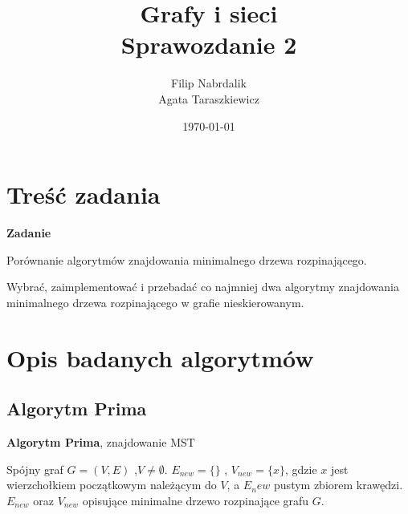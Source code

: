 \documentclass[a4paper, 10pt]{article}
\title{{\bf {Grafy i sieci}} \\ {\large Sprawozdanie 2}}
\date{\today}
\author{Filip Nabrdalik \\Agata Taraszkiewicz}
\begin{document}


\maketitle 




\newcommand{\ang}[1]{(ang. {\em #1}\/)}
\newcommand{\e}[1]{{\em #1}\/}





\section{Treść zadania}

{\bf{Zadanie}}

Porównanie algorytmów znajdowania minimalnego drzewa rozpinającego.

Wybrać, zaimplementować i przebadać co najmniej dwa algorytmy znajdowania minimalnego drzewa rozpinającego w grafie nieskierowanym. 

 

\section{Opis badanych algorytmów}

	\subsection{Algorytm Prima}

\begin{algorithm}
\caption{{\bf Algorytm Prima}, znajdowanie MST}
\begin{algorithmic}[!h]
\REQUIRE Spójny graf $G=(V,E)$ ,$V \neq \emptyset$. 
\ENSURE $E_{new}=\{\}$ , $V_{new}=\{x\}$, gdzie $x$ jest wierzchołkiem początkowym należącym do $V$, a $E_new$ pustym zbiorem krawędzi.
\STATE {}
\STATE {}   
\ENDWHILE
\RETURN $E_{new}$ oraz $V_{new}$ opisujące minimalne drzewo rozpinające grafu $G$. 
\end{algorithmic}
\end{algorithm}	
	
\end{document}
